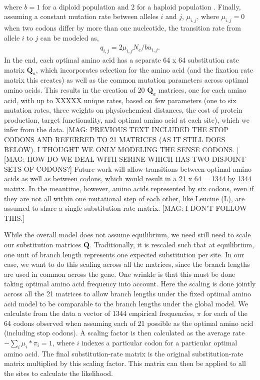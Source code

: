 \documentclass{article}
\newcommand{\Ne}{\ensuremath{{N_e}}\xspace} %
\newcommand{\Qmatrixa}{\ensuremath{\Qmatrix_a}\xspace}
\newcommand{\Qmatrix}{\mathbf{Q}\xspace}
\newcommand{\muij}{\ensuremath{\mu_{i,j}}\xspace}
\begin{document}
\begin{itemize}
\begin{align*}
\end{align*}
where $b=1$ for a diploid population and $2$ for a haploid population \cite{Iwasa88,BergAndLassig03,SellaAndHirsh05}.
Finally, assuming a constant mutation rate between alleles $i$ and $j$, $\muij$, where $\muij = 0$ when two codons differ by more than one nucleotide, the transition rate from allele $i$ to $j$ can be modeled as,
\begin{align*}
  q_{i,j} = 2 \muij \Ne/b u_{i,j}.
\end{align*}
In the end, each optimal amino acid has a separate 64 x 64 substitution rate matrix \Qmatrixa, which incorporates selection for the amino acid (and the fixation rate matrix this creates) as well as the common mutation parameters across optimal amino acids. 
This results in the creation of 20  \Qmatrixa  matrices, one for each amino acid, with up to XXXXX unique rates, based on few parameters (one to six mutation rates, three weights on physiochemical distances, the cost of protein production, target functionality, and optimal amino acid at each site), which we infer from the data.
[MAG: PREVIOUS TEXT INCLUDED THE STOP CODONS AND REFERRED TO 21 MATRICES (AS IT STILL DOES BELOW). 
I THOUGHT WE ONLY MODELING THE SENSE CODONS. ]
[MAG: HOW DO WE DEAL WITH SERINE WHICH HAS TWO DISJOINT SETS OF CODONS?]
Future work will allow transitions between optimal amino acids as well as between codons, which would result in a 21 x 64 = 1344 by 1344 matrix. 
In the meantime, however, amino acids represented by six codons, even if they are not all within one mutational step of each other, like Leucine (L), are assumed to share a single substitution-rate matrix. [MAG: I DON'T FOLLOW THIS.]

While the overall model does not assume equilibrium, we need still need to scale our substitution matrices $\Qmatrix$.
Traditionally, it is rescaled such that at equilibrium, one unit of branch length represents one expected substitution per site.
In our case, we want to do this scaling across all the matrices, since the branch lengths are used in common across the gene.
One wrinkle is that this must be done taking optimal amino acid frequency into account. 
Here the scaling is done jointly across all the 21 matrices to allow branch lengths under the fixed optimal amino acid model to be comparable to the branch lengths under the global model.
We calculate from the data a vector of 1344 empirical frequencies, $\pi$ for each of the 64 codons observed when assuming each of 21 possible as the optimal amino acid (including stop codons).
A scaling factor is then calculated as the average rate $-\sum_i{} \mu_i*\pi_i=1$, where $i$ indexes a particular codon for a particular optimal amino acid.
The final substitution-rate matrix is the original substitution-rate matrix multiplied by this scaling factor.
This matrix can then be applied to all the sites to calculate the likelihood. 


\end{itemize}
\end{document}
